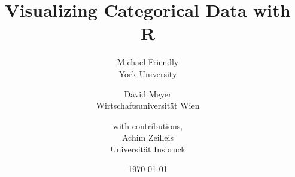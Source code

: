 %
\title{%
\Huge{Visualizing Categorical Data with R} 
%
%
}
\author{
	{\Large Michael Friendly} \\ York University
	\and
	{\Large David Meyer} \\ Wirtschaftsuniversit\"at Wien
	\and
	with contributions, \\ {\Large Achim Zeilleis} \\ Universit\"at Insbruck
}
\date{\today}
\vspace{1cm}
\maketitle
